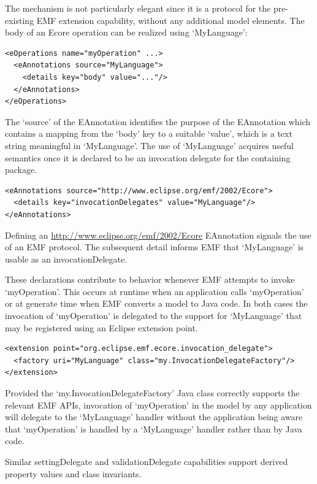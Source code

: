 \documentclass[a4paper]{article}
\begin{document}
The mechanism is not particularly elegant since it is a protocol for the pre-existing EMF extension capability, without any additional model elements. The body of an Ecore operation can be realized using `MyLanguage':

\begin{verbatim}
<eOperations name="myOperation" ...>
  <eAnnotations source="MyLanguage">
    <details key="body" value="..."/>
  </eAnnotations>
</eOperations>
\end{verbatim}

The `source' of the EAnnotation identifies the purpose of the EAnnotation which contains a mapping from the `body' key to a suitable `value', which is a text string meaningful in `MyLanguage'. The use of `MyLanguage' acquires useful semantics once it is declared to be an invocation delegate for the containing package.

\begin{verbatim}
<eAnnotations source="http://www.eclipse.org/emf/2002/Ecore">
  <details key="invocationDelegates" value="MyLanguage"/>
</eAnnotations>
\end{verbatim}

Defining an  \url{http://www.eclipse.org/emf/2002/Ecore} EAnnotation signals the use of an EMF protocol. The subsequent detail informs EMF that `MyLanguage' is usable as an invocationDelegate.

These declarations contribute to behavior whenever EMF attempts to invoke `myOperation'. This occurs at runtime when an application calls `myOperation' or at generate time when EMF converts a model to Java code. In both cases the invocation of `myOperation' is delegated to the support for `MyLanguage' that may be registered using an Eclipse extension point.

\begin{verbatim}
<extension point="org.eclipse.emf.ecore.invocation_delegate">
  <factory uri="MyLanguage" class="my.InvocationDelegateFactory"/>
</extension>
\end{verbatim}

Provided the `my.InvocationDelegateFactory' Java class correctly supports the relevant EMF APIs, invocation of `myOperation' in the model by any application will delegate to the `MyLanguage' handler without the application being aware that `myOperation' is handled by a `MyLanguage' handler rather than by Java code.

Similar settingDelegate and validationDelegate capabilities support derived property values and class invariants.
\end{document}
